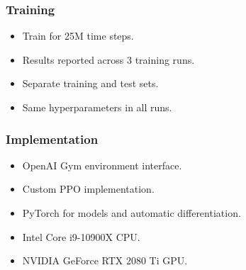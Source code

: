 \begin{frame}
    \frametitle{Training}

    \begin{itemize}
        \item Train for 25M time steps.
        \item Results reported across 3 training runs.
        \item Separate training and test sets.
        \item Same hyperparameters in all runs.
    \end{itemize}
\end{frame}

\begin{frame}
    \frametitle{Implementation}

    \begin{itemize}
        \item OpenAI Gym environment interface.
        \item Custom PPO implementation.
        \item PyTorch for models and automatic differentiation.
        \item Intel Core i9-10900X CPU.
        \item NVIDIA GeForce RTX 2080 Ti GPU.
    \end{itemize}
\end{frame}
